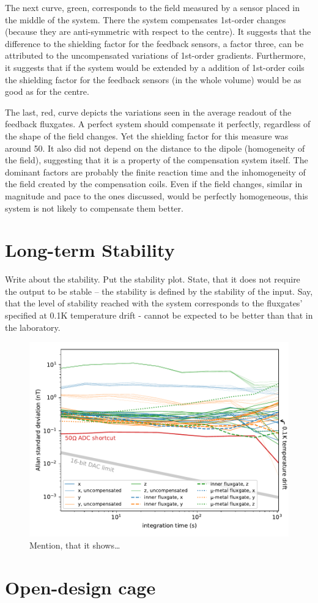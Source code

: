 The next curve, green, corresponds to the field measured by a sensor placed in the middle of the system. There the system compensates 1st-order changes (because they are anti-symmetric with respect to the centre). It suggests that the difference to the shielding factor for the feedback sensors, a factor three, can be attributed to the uncompensated variations of 1st-order gradients. Furthermore, it suggests that if the system would be extended by a addition of 1st-order coils the shielding factor for the feedback sensors (in the whole volume) would be as good as for the centre.

The last, red, curve depicts the variations seen in the average readout of the feedback fluxgates. A perfect system should compensate it perfectly, regardless of the shape of the field changes. Yet the shielding factor for this measure was around 50. It also did not depend on the distance to the dipole (homogeneity of the field), suggesting that it is a property of the compensation system itself. The dominant factors are probably the finite reaction time and the inhomogeneity of the field created by the compensation coils. Even if the field changes, similar in magnitude and pace to the ones discussed, would be perfectly homogeneous, this system is not likely to compensate them better.


\section{Long-term Stability}
Write about the stability. Put the stability plot. State, that it does not require the output to be stable -- the stability is defined by the stability of the input. Say, that the level of stability reached with the system corresponds to the fluxgates' specified at 0.1K temperature drift - cannot be expected to be better than that in the laboratory.

\begin{figure}
  \centering
  \includegraphics[width=0.9\linewidth]{gfx/prototype/run7_field_stability.pdf}
  \caption{Mention, that it shows\ldots}
  \label{fig:prototype_stability}
\end{figure}



\section{Open-design cage}

